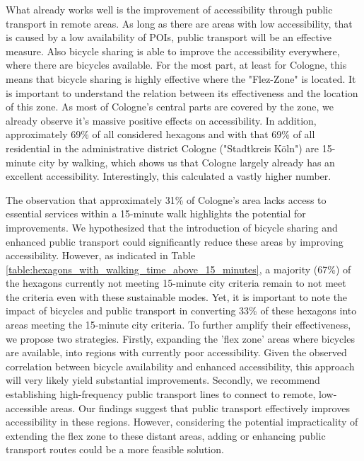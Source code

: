 What already works well is the improvement of accessibility through public transport in remote areas.
As long as there are areas with low accessibility, that is caused by a low availability of POIs, public transport will be an effective measure.
Also bicycle sharing is able to improve the accessibility everywhere, where there are bicycles available.
For the most part, at least for Cologne, this means that bicycle sharing is highly effective where the "Flez-Zone" is located.
It is important to understand the relation between its effectiveness and the location of this zone.
As most of Cologne's central parts are covered by the zone, we already observe it's massive positive effects on accessibility.
In addition, approximately 69\% of all considered hexagons and with that 69\% of all residential in the administrative district Cologne ("Stadtkreis Köln") are 15-minute city by walking, which shows us that Cologne largely already has an excellent accessibility.
Interestingly, this \cite{nicolettiDisadvantagedCommunitiesHave2023} calculated a vastly higher number. 

The observation that approximately 31\% of Cologne's area lacks access to essential services within a 15-minute walk highlights the potential for improvements.
We hypothesized that the introduction of bicycle sharing and enhanced public transport could significantly reduce these areas by improving accessibility.
However, as indicated in Table \ref{table:hexagons_with_walking_time_above_15_minutes}, a majority (67\%) of the hexagons currently not meeting 15-minute city criteria remain to not meet the criteria even with these sustainable modes.
Yet, it is important to note the impact of bicycles and public transport in converting 33\% of these hexagons into areas meeting the 15-minute city criteria.
To further amplify their effectiveness, we propose two strategies.
Firstly, expanding the 'flex zone' areas where bicycles are available, into regions with currently poor accessibility. 
Given the observed correlation between bicycle availability and enhanced accessibility, this approach will very likely yield substantial improvements.
Secondly, we recommend establishing high-frequency public transport lines to connect to remote, low-accessible areas. 
Our findings suggest that public transport effectively improves accessibility in these regions. 
However, considering the potential impracticality of extending the flex zone to these distant areas, adding or enhancing public transport routes could be a more feasible solution.



